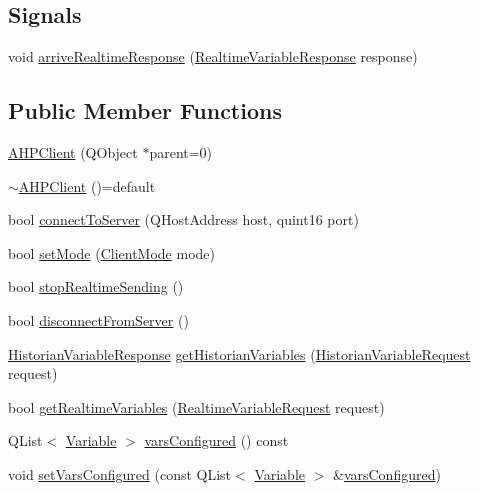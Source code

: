 \subsection*{Signals}
\begin{DoxyCompactItemize}
\item 
void \hyperlink{class_a_h_p_1_1_a_h_p_client_a6063cec228440b05ee13fc70930ceb10}{arrive\+Realtime\+Response} (\hyperlink{class_a_h_p_1_1_realtime_variable_response}{Realtime\+Variable\+Response} response)
\end{DoxyCompactItemize}
\subsection*{Public Member Functions}
\begin{DoxyCompactItemize}
\item 
\hyperlink{class_a_h_p_1_1_a_h_p_client_a6c731a6ad6c4baa109a3d3586b49d162}{A\+H\+P\+Client} (Q\+Object $\ast$parent=0)
\item 
\hyperlink{class_a_h_p_1_1_a_h_p_client_a7e0619458e9b08a02b243ba2169edf32}{$\sim$\+A\+H\+P\+Client} ()=default
\item 
bool \hyperlink{class_a_h_p_1_1_a_h_p_client_a1e1f5a22643e3cd5f6f62dba63b36751}{connect\+To\+Server} (Q\+Host\+Address host, quint16 port)
\item 
bool \hyperlink{class_a_h_p_1_1_a_h_p_client_ae3514ac4a03e6cde792cc788e72f61e0}{set\+Mode} (\hyperlink{namespace_a_h_p_a130fcb3fee4e9ea58cc099ea76b62884}{Client\+Mode} mode)
\item 
bool \hyperlink{class_a_h_p_1_1_a_h_p_client_a15d5fddc918eb40c17dfdd3f75f9bf9d}{stop\+Realtime\+Sending} ()
\item 
bool \hyperlink{class_a_h_p_1_1_a_h_p_client_a6fcfb5bcc82f3c11e801bb11e39bc3ff}{disconnect\+From\+Server} ()
\item 
\hyperlink{class_a_h_p_1_1_historian_variable_response}{Historian\+Variable\+Response} \hyperlink{class_a_h_p_1_1_a_h_p_client_aa960dc82312cb67d4c987e4e8d7bf5e4}{get\+Historian\+Variables} (\hyperlink{class_a_h_p_1_1_historian_variable_request}{Historian\+Variable\+Request} request)
\item 
bool \hyperlink{class_a_h_p_1_1_a_h_p_client_ac03dbd523285c1b4bcf2bdf95dd5d773}{get\+Realtime\+Variables} (\hyperlink{class_a_h_p_1_1_realtime_variable_request}{Realtime\+Variable\+Request} request)
\item 
Q\+List$<$ \hyperlink{class_variable}{Variable} $>$ \hyperlink{class_a_h_p_1_1_a_h_p_client_ac2783516a8ea9e8ed1feaf2564816b97}{vars\+Configured} () const 
\item 
void \hyperlink{class_a_h_p_1_1_a_h_p_client_a2d31bbae150332753f72cbd92f9444cb}{set\+Vars\+Configured} (const Q\+List$<$ \hyperlink{class_variable}{Variable} $>$ \&\hyperlink{class_a_h_p_1_1_a_h_p_client_ac2783516a8ea9e8ed1feaf2564816b97}{vars\+Configured})
\end{DoxyCompactItemize}



